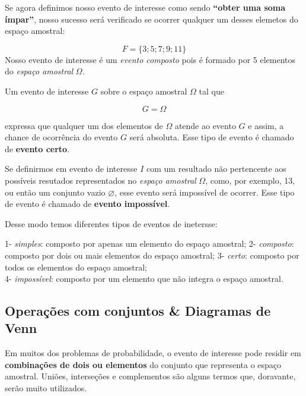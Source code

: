 \documentclass[
]{book}
\begin{document}
\hfill\break

Se agora definimos nosso evento de interesse como sendo \textbf{``obter uma soma ímpar''}, nosso sucesso será verificado se ocorrer qualquer um desses elemetos do espaço amostral:

\[
F=\{3;5;7;9;11\}
\]
Nosso evento de interesse é um \emph{evento composto} pois é formado por 5 elementos do \emph{espaço amostral} \(\Omega\).

Um evento de interesse \(G\) sobre o espaço amostral \(\Omega\) tal que

\[
G=\Omega
\]

expressa que qualquer um dos elementos de \(\Omega\) atende ao evento \(G\) e assim, a chance de ocorrência do evento \(G\) será absoluta. Esse tipo de evento é chamado de \textbf{evento certo}.

Se definirmos em evento de interesse \(I\) com um resultado não pertencente aos possíveis resutados representados no \emph{espaço amostral} \(\Omega\), como, por exemplo, 13, ou então um conjunto vazio \(\varnothing\), esse evento será impossível de ocorrer. Esse tipo de evento é chamado de \textbf{evento impossível}.

Desse modo temos diferentes tipos de eventos de inetersse:

1- \emph{simples}: composto por apenas um elemento do espaço amostral;
2- \emph{composto}: composto por dois ou mais elementos do espaço amostral;
3- \emph{certo}: composto por todos os elementos do espaço amostral;\\
4- \emph{impossível}: composto por um elemento que não integra o espaço amostral.

\hypertarget{operauxe7uxf5es-com-conjuntos-diagramas-de-venn}{%
\subsection{Operações com conjuntos \& Diagramas de Venn}\label{operauxe7uxf5es-com-conjuntos-diagramas-de-venn}}

\hfill\break

Em muitos dos problemas de probabilidade, o evento de interesse pode residir em \textbf{combinações de dois ou elementos} do conjunto que representa o espaço amostral. Uniões, interseções e complementos são alguns termos que, doravante, serão muito utilizados.

\hfill\break
\end{document}
